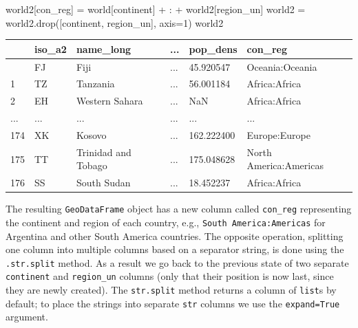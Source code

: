 \documentclass[
  letterpaper,
]{krantz}
\newenvironment{Shaded}{\begin{snugshade}}{\end{snugshade}}
\newcommand{\DecValTok}[1]{\textcolor[rgb]{0.68,0.00,0.00}{#1}}
\newcommand{\NormalTok}[1]{\textcolor[rgb]{0.00,0.23,0.31}{#1}}
\newcommand{\OperatorTok}[1]{\textcolor[rgb]{0.37,0.37,0.37}{#1}}
\newcommand{\StringTok}[1]{\textcolor[rgb]{0.13,0.47,0.30}{#1}}
\begin{document}
\begin{Shaded}
\begin{Highlighting}[]
\NormalTok{world2[}\StringTok{\textquotesingle{}con\_reg\textquotesingle{}}\NormalTok{] }\OperatorTok{=}\NormalTok{ world[}\StringTok{\textquotesingle{}continent\textquotesingle{}}\NormalTok{] }\OperatorTok{+} \StringTok{\textquotesingle{}:\textquotesingle{}} \OperatorTok{+}\NormalTok{ world2[}\StringTok{\textquotesingle{}region\_un\textquotesingle{}}\NormalTok{]}
\NormalTok{world2 }\OperatorTok{=}\NormalTok{ world2.drop([}\StringTok{\textquotesingle{}continent\textquotesingle{}}\NormalTok{, }\StringTok{\textquotesingle{}region\_un\textquotesingle{}}\NormalTok{], axis}\OperatorTok{=}\DecValTok{1}\NormalTok{)}
\NormalTok{world2}
\end{Highlighting}
\end{Shaded}

\begin{longtable}[]{@{}llllll@{}}
\toprule\noalign{}
& iso\_a2 & name\_long & ... & pop\_dens & con\_reg \\
\midrule\noalign{}
\endhead
\bottomrule\noalign{}
\endlastfoot
0 & FJ & Fiji & ... & 45.920547 & Oceania:Oceania \\
1 & TZ & Tanzania & ... & 56.001184 & Africa:Africa \\
2 & EH & Western Sahara & ... & NaN & Africa:Africa \\
... & ... & ... & ... & ... & ... \\
174 & XK & Kosovo & ... & 162.222400 & Europe:Europe \\
175 & TT & Trinidad and Tobago & ... & 175.048628 & North
America:Americas \\
176 & SS & South Sudan & ... & 18.452237 & Africa:Africa \\
\end{longtable}

The resulting \texttt{GeoDataFrame} object has a new column called
\texttt{con\_reg} representing the continent and region of each country,
e.g.,
\texttt{\textquotesingle{}South\ America:Americas\textquotesingle{}} for
Argentina and other South America countries. The opposite operation,
splitting one column into multiple columns based on a separator string,
is done using the \texttt{.str.split} method. As a result we go back to
the previous state of two separate \texttt{continent} and
\texttt{region\_un} columns (only that their position is now last, since
they are newly created). The \texttt{str.split} method returns a column
of \texttt{list}s by default; to place the strings into separate
\texttt{str} columns we use the \texttt{expand=True} argument.
\end{document}
